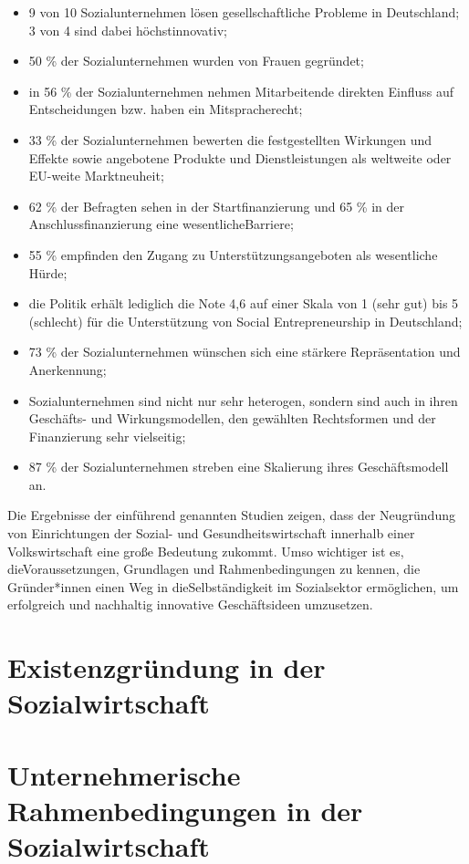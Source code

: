 \documentclass[
  letterpaper,
]{book}
\begin{document}
\begin{itemize}
\item
  9 von 10 Sozialunternehmen lösen gesellschaftliche Probleme in
  Deutschland; 3 von 4 sind dabei höchstinnovativ;
\item
  50 \% der Sozialunternehmen wurden von Frauen gegründet;
\item
  in 56 \% der Sozialunternehmen nehmen Mitarbeitende direkten Einfluss
  auf Entscheidungen bzw. haben ein Mitspracherecht;
\item
  33 \% der Sozialunternehmen bewerten die festgestellten Wirkungen und
  Effekte sowie angebotene Produkte und Dienstleistungen als weltweite
  oder EU-weite Marktneuheit;
\item
  62 \% der Befragten sehen in der Startfinanzierung und 65 \% in der
  Anschlussfinanzierung eine wesentlicheBarriere;
\item
  55 \% empfinden den Zugang zu Unterstützungsangeboten als wesentliche
  Hürde;
\item
  die Politik erhält lediglich die Note 4,6 auf einer Skala von 1 (sehr
  gut) bis 5 (schlecht) für die Unterstützung von Social
  Entrepreneurship in Deutschland;
\item
  73 \% der Sozialunternehmen wünschen sich eine stärkere Repräsentation
  und Anerkennung;
\item
  Sozialunternehmen sind nicht nur sehr heterogen, sondern sind auch in
  ihren Geschäfts- und Wirkungsmodellen, den gewählten Rechtsformen und
  der Finanzierung sehr vielseitig;
\item
  87 \% der Sozialunternehmen streben eine Skalierung ihres
  Geschäftsmodell an.
\end{itemize}

Die Ergebnisse der einführend genannten Studien zeigen, dass der
Neugründung von Einrichtungen der Sozial- und Gesundheitswirtschaft
innerhalb einer Volkswirtschaft eine große Bedeutung zukommt. Umso
wichtiger ist es, dieVoraussetzungen, Grundlagen und Rahmenbedingungen
zu kennen, die Gründer*innen einen Weg in dieSelbständigkeit im
Sozialsektor ermöglichen, um erfolgreich und nachhaltig innovative
Geschäftsideen umzusetzen.

\section{Existenzgründung in der
Sozialwirtschaft}\label{existenzgrndung-in-der-sozialwirtschaft}

\section{Unternehmerische Rahmenbedingungen in der
Sozialwirtschaft}\label{unternehmerische-rahmenbedingungen}
\end{document}
